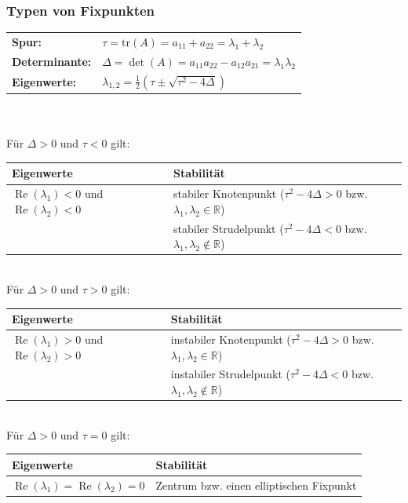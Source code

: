 \subsubsection{Typen von Fixpunkten}

\begin{tabular}{ll}
	\textbf{Spur:} \qquad & $\tau = \mathrm{tr}(A) = a_{11} + a_{22} = \lambda_1 + \lambda_2$ \\
	\textbf{Determinante:} & $\Delta = \det(A) = a_{11}a_{22}  - a_{12}a_{21} = \lambda_1 \lambda_2$\\
	\textbf{Eigenwerte:} & $\lambda_{1,2} = \frac{1}{2} \left(\tau \pm \sqrt{\tau^2 - 4\Delta}\right)$ \\
\end{tabular}\\ \\

Für $\Delta > 0$ und $\tau < 0$ gilt: \\
\begin{tabular}{|p{5cm}|p{13cm}|}
\hline \textbf{Eigenwerte} & \textbf{Stabilität} \\ 
\hline $\operatorname{Re}(\lambda_1) < 0$ und $\operatorname{Re}(\lambda_2) < 0$ & stabiler Knotenpunkt ($\tau^2 - 4 \Delta > 0$ bzw. $ \lambda_1, \lambda_2 \in \mathbb{R}$) \\ 
 & stabiler Strudelpunkt ($\tau^2 - 4 \Delta < 0$ bzw. $ \lambda_1, \lambda_2 \notin \mathbb{R}$) \\
\hline 
\end{tabular} \\

Für $\Delta > 0$ und $\tau > 0$ gilt: \\
\begin{tabular}{|p{5cm}|p{13cm}|}
\hline \textbf{Eigenwerte} & \textbf{Stabilität} \\ 
\hline $\operatorname{Re}(\lambda_1) > 0$ und $\operatorname{Re}(\lambda_2) > 0$ & instabiler Knotenpunkt ($\tau^2 - 4 \Delta > 0$ bzw. $ \lambda_1, \lambda_2 \in \mathbb{R}$) \\ 
 & instabiler Strudelpunkt ($\tau^2 - 4 \Delta < 0$ bzw. $ \lambda_1, \lambda_2 \notin \mathbb{R}$) \\
\hline 
\end{tabular} \\

Für $\Delta > 0$ und $\tau = 0$ gilt: \\
\begin{tabular}{|p{5cm}|p{13cm}|}
\hline \textbf{Eigenwerte} & \textbf{Stabilität} \\ 
\hline $\operatorname{Re}(\lambda_1) = \operatorname{Re}(\lambda_2) = 0$ & Zentrum bzw. einen elliptischen Fixpunkt\\
\hline 
\end{tabular} \\


